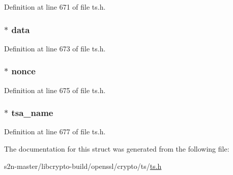Definition at line 671 of file ts.\+h.

\subsubsection[{\texorpdfstring{data}{data}}]{ $\ast$ data}\hypertarget{struct_t_s__verify__ctx_a90339a8d7ad115b5e698d4d16516fc6a}{}\label{struct_t_s__verify__ctx_a90339a8d7ad115b5e698d4d16516fc6a}


Definition at line 673 of file ts.\+h.

\subsubsection[{\texorpdfstring{nonce}{nonce}}]{ $\ast$ nonce}\hypertarget{struct_t_s__verify__ctx_a8b13ecb2aac904e4547773630a3b51e6}{}\label{struct_t_s__verify__ctx_a8b13ecb2aac904e4547773630a3b51e6}


Definition at line 675 of file ts.\+h.

\subsubsection[{\texorpdfstring{tsa\+\_\+name}{tsa_name}}]{ $\ast$ tsa\+\_\+name}\hypertarget{struct_t_s__verify__ctx_ae635e139260d4467cf706759a9a4bcdb}{}\label{struct_t_s__verify__ctx_ae635e139260d4467cf706759a9a4bcdb}


Definition at line 677 of file ts.\+h.



The documentation for this struct was generated from the following file\+:\begin{DoxyCompactItemize}
\item 
s2n-\/master/libcrypto-\/build/openssl/crypto/ts/\hyperlink{crypto_2ts_2ts_8h}{ts.\+h}\end{DoxyCompactItemize}
